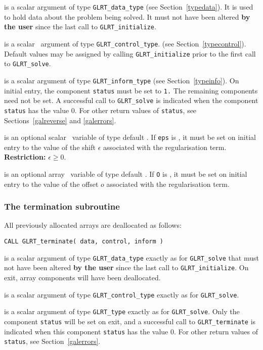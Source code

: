 \documentclass{galahad}
\newcommand{\packagename}{GL\-RT}
\begin{document}
\begin{description}
 is a scalar \intentinout argument of type
{\tt \packagename\_data\_type}
(see Section~\ref{typedata}). It is used to hold data about the problem being
solved. It must not have been altered {\bf by the user} since the last call to
{\tt \packagename\_initialize}.

 is a scalar \intentin\ argument of type
{\tt \packagename\_control\_type}.
(see Section~\ref{typecontrol}).
Default values may be assigned by calling {\tt \packagename\_initialize}
prior to the first call to {\tt \packagename\_solve}.

 is a scalar \intentinout argument of type
{\tt \packagename\_inform\_type}
(see Section~\ref{typeinfo}).
On initial entry, the component {\tt status} must be set to {\tt 1.}
The remaining components need not be set.
A successful call to
{\tt \packagename\_solve}
is indicated when the  component {\tt status} has the value 0.
For other return values of {\tt status}, see Sections~\ref{galreverse}
and \ref{galerrors}.

 is an optional scalar \intentin\ variable of type default
\realdp. If {\tt eps} is \present, it must be set on initial entry
to the value of the shift $\epsilon$ associated with the regularisation term.
{\bf Restriction: } $\epsilon \geq 0$.

 is an optional array \intentin\ variable of type default
\realdp. If {\tt O} is \present, it must be set on initial entry
to the value of the offset $o$ associated with the regularisation term.

\end{description}


\subsubsection{The  termination subroutine}
All previously allocated arrays are deallocated as follows:

\hskip0.5in
{\tt CALL \packagename\_terminate( data, control, inform )}

\begin{description}

 is a scalar \intentinout argument of type
{\tt \packagename\_data\_type}
exactly as for
{\tt \packagename\_solve}
that must not have been altered {\bf by the user} since the last call to
{\tt \packagename\_initialize}.
On exit, array components will have been deallocated.

 is a scalar \intentin argument of type
{\tt \packagename\_control\_type}
exactly as for
{\tt \packagename\_solve}.

 is a scalar \intentout argument of type {\tt \packagename\_type}
exactly as for
{\tt \packagename\_solve}.
Only the component {\tt status} will be set on exit, and a
successful call to
{\tt \packagename\_terminate}
is indicated when this  component {\tt status} has the value 0.
For other return values of {\tt status}, see Section~\ref{galerrors}.

\end{description}
\end{document}
